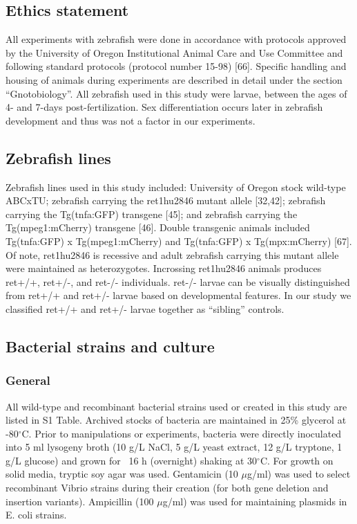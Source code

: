 \subsection{Ethics statement}
All experiments with zebrafish were done in accordance with protocols approved by the University of Oregon Institutional Animal Care and Use Committee and following standard protocols (protocol number 15-98) [66]. Specific handling and housing of animals during experiments are described in detail under the section ``Gnotobiology''. All zebrafish used in this study were larvae, between the ages of 4- and 7-days post-fertilization. Sex differentiation occurs later in zebrafish development and thus was not a factor in our experiments.

\subsection{Zebrafish lines}
Zebrafish lines used in this study included: University of Oregon stock wild-type ABCxTU; zebrafish carrying the ret1hu2846 mutant allele [32,42]; zebrafish carrying the Tg(tnfa:GFP) transgene [45]; and zebrafish carrying the Tg(mpeg1:mCherry) transgene [46]. Double transgenic animals included Tg(tnfa:GFP) x Tg(mpeg1:mCherry) and Tg(tnfa:GFP) x Tg(mpx:mCherry) [67]. Of note, ret1hu2846 is recessive and adult zebrafish carrying this mutant allele were maintained as heterozygotes. Incrossing ret1hu2846 animals produces ret+/+, ret+/-, and ret-/- individuals. ret-/- larvae can be visually distinguished from ret+/+ and ret+/- larvae based on developmental features. In our study we classified ret+/+ and ret+/- larvae together as ``sibling'' controls. 

\subsection{Bacterial strains and culture}

\subsubsection{General}
All wild-type and recombinant bacterial strains used or created in this study are listed in S1 Table. Archived stocks of bacteria are maintained in 25\% glycerol at -80$^\circ$C. Prior to manipulations or experiments, bacteria were directly inoculated into 5 ml lysogeny broth (10 g/L NaCl, 5 g/L yeast extract, 12 g/L tryptone, 1 g/L glucose) and grown for ~16 h (overnight) shaking at 30$^\circ$C. For growth on solid media, tryptic soy agar was used. Gentamicin (10 $\mu$g/ml) was used to select recombinant Vibrio strains during their creation (for both gene deletion and insertion variants). Ampicillin (100 $\mu$g/ml) was used for maintaining plasmids in E. coli strains. 

